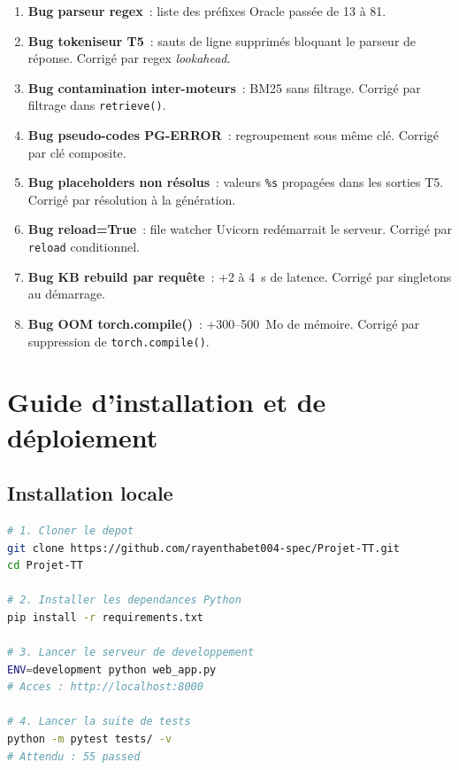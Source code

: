 \documentclass[12pt,a4paper]{report}
\begin{document}
\begin{enumerate}[leftmargin=*]
  \item \textbf{Bug parseur regex}~: liste des pr\'efixes Oracle pass\'ee de 13 \`a 81.
  \item \textbf{Bug tokeniseur T5}~: sauts de ligne supprim\'es bloquant le parseur
        de r\'eponse. Corrig\'e par regex \emph{lookahead}.
  \item \textbf{Bug contamination inter-moteurs}~: BM25 sans filtrage. Corrig\'e
        par filtrage dans \texttt{retrieve()}.
  \item \textbf{Bug pseudo-codes PG-ERROR}~: regroupement sous m\^eme cl\'e.
        Corrig\'e par cl\'e composite.
  \item \textbf{Bug placeholders non r\'esolus}~: valeurs \texttt{\%s} propag\'ees
        dans les sorties T5. Corrig\'e par r\'esolution \`a la g\'en\'eration.
  \item \textbf{Bug reload=True}~: file watcher Uvicorn red\'emarrait le serveur.
        Corrig\'e par \texttt{reload} conditionnel.
  \item \textbf{Bug KB rebuild par requ\^ete}~: +2 \`a 4~s de latence.
        Corrig\'e par singletons au d\'emarrage.
  \item \textbf{Bug OOM torch.compile()}~: +300--500~Mo de m\'emoire.
        Corrig\'e par suppression de \texttt{torch.compile()}.
\end{enumerate}

\chapter{Guide d'installation et de d\'eploiement}

\section{Installation locale}

\begin{lstlisting}[language=bash,caption={Installation locale},label=lst:install]
# 1. Cloner le depot
git clone https://github.com/rayenthabet004-spec/Projet-TT.git
cd Projet-TT

# 2. Installer les dependances Python
pip install -r requirements.txt

# 3. Lancer le serveur de developpement
ENV=development python web_app.py
# Acces : http://localhost:8000

# 4. Lancer la suite de tests
python -m pytest tests/ -v
# Attendu : 55 passed
\end{lstlisting}
\end{document}
